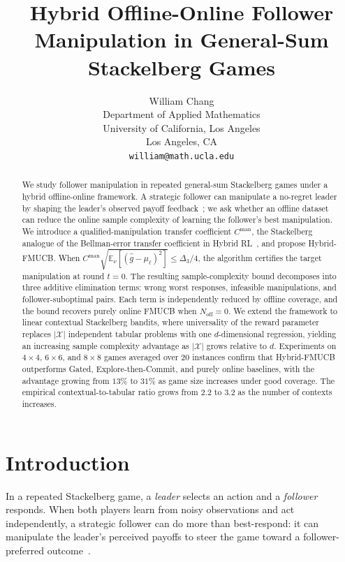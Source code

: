 \documentclass{article}
\title{Hybrid Offline-Online Follower Manipulation in General-Sum Stackelberg Games}
\author{William Chang \\
Department of Applied Mathematics\\
University of California, Los Angeles\\
Los Angeles, CA \\
\texttt{william@math.ucla.edu} \\
}
\newcommand{\cX}{\mathcal{X}}
\newcommand{\E}{\mathbb{E}}           %
\begin{document}
\maketitle
\begin{abstract}
We study follower manipulation in repeated general-sum Stackelberg games under a hybrid offline-online framework. A strategic follower can manipulate a no-regret leader by shaping the leader's observed payoff feedback~\cite{yu2024decentralized}; we ask whether an offline dataset can reduce the online sample complexity of learning the follower's best manipulation. We introduce a qualified-manipulation transfer coefficient $C^{\mathrm{man}}$, the Stackelberg analogue of the Bellman-error transfer coefficient in Hybrid RL~\cite{song2022hybrid}, and propose Hybrid-FMUCB. When $C^{\mathrm{man}}\sqrt{\E_\nu[(\widehat g-\mu_\ell)^2]}\le\Delta_3/4$, the algorithm certifies the target manipulation at round $t = 0$. The resulting sample-complexity bound decomposes into three additive elimination terms: wrong worst responses, infeasible manipulations, and follower-suboptimal pairs. Each term is independently reduced by offline coverage, and the bound recovers purely online FMUCB when $N_{\mathrm{off}}=0$. We extend the framework to linear contextual Stackelberg bandits, where universality of the reward parameter replaces $|\cX|$ independent tabular problems with one $d$-dimensional regression, yielding an increasing sample complexity advantage as $|\cX|$ grows relative to $d$. Experiments on $4\times 4$, $6\times 6$, and $8\times 8$ games averaged over 20 instances confirm that Hybrid-FMUCB outperforms Gated, Explore-then-Commit, and purely online baselines, with the advantage growing from $13\%$ to $31\%$ as game size increases under good coverage. The empirical contextual-to-tabular ratio grows from $2.2$ to $3.2$ as the number of contexts increases.
\end{abstract}

\section{Introduction}
\label{sec:intro}
In a repeated Stackelberg game, a \emph{leader} selects an action and a \emph{follower} responds. When both players learn from noisy observations and act independently, a strategic follower can do more than best-respond: it can manipulate the leader's perceived payoffs to steer the game toward a follower-preferred outcome~\cite{gan2019manipulating, chen2025optimal, yu2024decentralized}.
\end{document}
